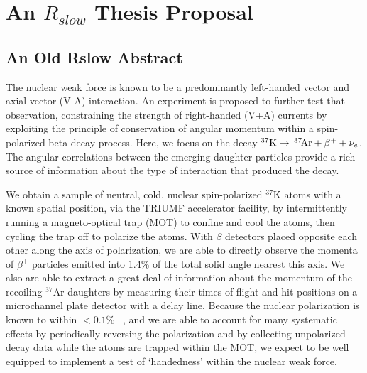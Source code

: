 


\clearpage	
\chapter{An $R_{slow}$ Thesis Proposal}


\section{An Old Rslow Abstract}
The nuclear weak force is known to be a predominantly left-handed vector and axial-vector (V-A) interaction.  An experiment is proposed to further test that observation, constraining the strength of right-handed (V+A) currents by exploiting the principle of conservation of angular momentum within a spin-polarized beta decay process.  Here, we focus on the decay \mbox{$^{37}\textrm{K} \rightarrow \,^{37}\textrm{\!Ar} + \beta^{+} + \nu_e$}.  The angular correlations between the emerging daughter particles provide a rich source of information about the type of interaction that produced the decay. 



We obtain a sample of neutral, cold, nuclear spin-polarized $^{37}\textrm{K}$ atoms with a known spatial position, via the TRIUMF accelerator facility, by intermittently running a magneto-optical trap (MOT) to confine and cool the atoms, then cycling the trap off to polarize the atoms.  With $\beta$ detectors placed opposite each other along the axis of polarization, 
we are able to directly observe the momenta of $\beta^+$ particles emitted into 1.4\% of the total solid angle nearest this axis.
We also are able to extract a great deal of information about the momentum of the recoiling $^{37\!}$Ar daughters by measuring their times of flight and hit positions on a microchannel plate detector with a delay line.  Because the nuclear polarization is known to within $<0.1\%$
~\cite{ben_OP}, and we are able to account for many systematic effects by periodically reversing the polarization and by collecting unpolarized decay data while the atoms are trapped within the MOT, we expect to be well equipped to implement a test of `handedness' within the nuclear weak force.

